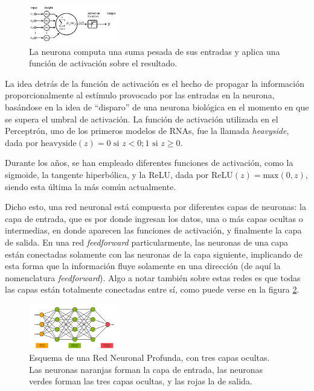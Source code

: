 \documentclass[aps,twocolumn,groupedaddress]{revtex4-2}
\begin{document}
\begin{figure}[h!]
    \centering
    \includegraphics[width=0.35\textwidth]{figs/neuron.png}
    \caption{La neurona computa una suma pesada de sus entradas y aplica una función de activación sobre el resultado.}
    \label{fig:neuron}
\end{figure}

La idea detrás de la función de activación es el hecho de propagar la información proporcionalmente al estímulo provocado por las entradas en la neurona, basándose en la idea de ``disparo'' de una neurona biológica en el momento en que se supera el umbral de activación. La función de activación utilizada en el Perceptrón, uno de los primeros modelos de RNAs, fue la llamada \textit{heavyside}, dada por \(\text{heavyside}(z)=0\text{ si }z < 0; 1\text{ si } z\geq0\). 

Durante los años, se han empleado diferentes funciones de activación, como la sigmoide, la tangente hiperbólica, y la ReLU, dada por \(\text{ReLU}(z)=\text{max}(0, z)\), siendo esta última la más común actualmente.

Dicho esto, una red neuronal está compuesta por diferentes capas de neuronas: la capa de entrada, que es por donde ingresan los datos, una o más capas ocultas o intermedias, en donde aparecen las funciones de activación, y finalmente la capa de salida. En una red \textit{feedforward} particularmente, las neuronas de una capa están conectadas solamente con las neuronas de la capa siguiente, implicando de esta forma que la información fluye solamente en una dirección (de aquí la nomenclatura \textit{feedforward}). Algo a notar también sobre estas redes es que todas las capas están totalmente conectadas entre sí, como puede verse en la figura \ref{fig:neural-net}.

\begin{figure}[h!]
    \centering
    \includegraphics[width=0.35\textwidth]{figs/feedforward.png}
    \caption{Esquema de una Red Neuronal Profunda, con tres capas ocultas. Las neuronas naranjas forman la capa de entrada, las neuronas verdes forman las tres capas ocultas, y las rojas la de salida.}
    \label{fig:neural-net}
\end{figure}
\end{document}
